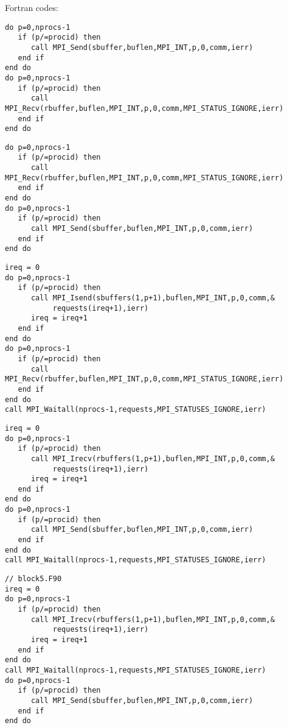     \pagebreak
    Fortran codes:
    
    \lstset{style=reviewcode,language=Fortran}

  \lstset{language=Fortran,basicstyle=\footnotesize\ttfamily}
\begin{lstlisting}
do p=0,nprocs-1
   if (p/=procid) then
      call MPI_Send(sbuffer,buflen,MPI_INT,p,0,comm,ierr)
   end if
end do
do p=0,nprocs-1
   if (p/=procid) then
      call MPI_Recv(rbuffer,buflen,MPI_INT,p,0,comm,MPI_STATUS_IGNORE,ierr)
   end if
end do
\end{lstlisting}
\begin{lstlisting}
do p=0,nprocs-1
   if (p/=procid) then
      call MPI_Recv(rbuffer,buflen,MPI_INT,p,0,comm,MPI_STATUS_IGNORE,ierr)
   end if
end do
do p=0,nprocs-1
   if (p/=procid) then
      call MPI_Send(sbuffer,buflen,MPI_INT,p,0,comm,ierr)
   end if
end do
\end{lstlisting}
\begin{lstlisting}
ireq = 0
do p=0,nprocs-1
   if (p/=procid) then
      call MPI_Isend(sbuffers(1,p+1),buflen,MPI_INT,p,0,comm,&
           requests(ireq+1),ierr)
      ireq = ireq+1
   end if
end do
do p=0,nprocs-1
   if (p/=procid) then
      call MPI_Recv(rbuffer,buflen,MPI_INT,p,0,comm,MPI_STATUS_IGNORE,ierr)
   end if
end do
call MPI_Waitall(nprocs-1,requests,MPI_STATUSES_IGNORE,ierr)
\end{lstlisting}
\begin{lstlisting}
ireq = 0
do p=0,nprocs-1
   if (p/=procid) then
      call MPI_Irecv(rbuffers(1,p+1),buflen,MPI_INT,p,0,comm,&
           requests(ireq+1),ierr)
      ireq = ireq+1
   end if
end do
do p=0,nprocs-1
   if (p/=procid) then
      call MPI_Send(sbuffer,buflen,MPI_INT,p,0,comm,ierr)
   end if
end do
call MPI_Waitall(nprocs-1,requests,MPI_STATUSES_IGNORE,ierr)
\end{lstlisting}
\begin{lstlisting}
// block5.F90
ireq = 0
do p=0,nprocs-1
   if (p/=procid) then
      call MPI_Irecv(rbuffers(1,p+1),buflen,MPI_INT,p,0,comm,&
           requests(ireq+1),ierr)
      ireq = ireq+1
   end if
end do
call MPI_Waitall(nprocs-1,requests,MPI_STATUSES_IGNORE,ierr)
do p=0,nprocs-1
   if (p/=procid) then
      call MPI_Send(sbuffer,buflen,MPI_INT,p,0,comm,ierr)
   end if
end do
\end{lstlisting}

